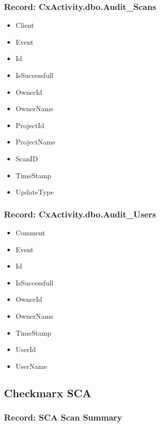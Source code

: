 \subsubsection{Record: CxActivity.dbo.Audit\_Scans}
\begin{itemize}
    \item Client
    \item Event
    \item Id
    \item IsSuccessfull
    \item OwnerId
    \item OwnerName
    \item ProjectId
    \item ProjectName
    \item ScanID
    \item TimeStamp
    \item UpdateType
\end{itemize}


\subsubsection{Record: CxActivity.dbo.Audit\_Users}
\begin{itemize}
    \item Comment
    \item Event
    \item Id
    \item IsSuccessfull
    \item OwnerId
    \item OwnerName
    \item TimeStamp
    \item UserId
    \item UserName
\end{itemize}


\subsection{Checkmarx SCA}


\subsubsection{Record: SCA Scan Summary}

